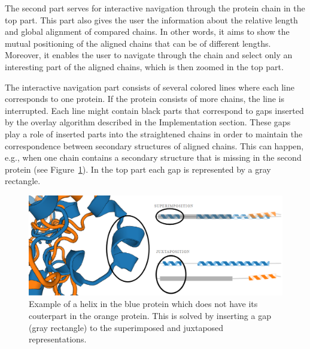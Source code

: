 \documentclass[twocolumn]{bmcart}%
\begin{document}
The second part serves for interactive navigation through the protein chain in the top part. 
This part also gives the user the information about the relative length and global alignment of compared chains.
In other words, it aims to show the mutual positioning of the aligned chains that can be of different lengths.
Moreover, it enables the user to navigate through the chain and select only an interesting part of the aligned chains, which is then zoomed in the top part.

The interactive navigation part consists of several colored lines where each line corresponds to one protein.
If the protein consists of more chains, the line is interrupted.
Each line might contain black parts that correspond to gaps inserted by the overlay algorithm described in the Implementation section.
These gaps play a role of inserted parts into the straightened chains in order to maintain the correspondence between secondary structures of aligned chains. 
This can happen, e.g., when one chain contains a secondary structure that is missing in the second protein (see Figure~\ref{fig:gap}).
In the top part each gap is represented by a gray rectangle.

\begin{figure}[t!]
  \centering
  \includegraphics[width=0.9\linewidth]{pics/gap2.png}
  \caption{Example of a helix in the blue protein which does not have its couterpart in the orange protein. This is solved by inserting a gap (gray rectangle) to the superimposed and juxtaposed representations.}
  \label{fig:gap}
\end{figure}
\end{document}
